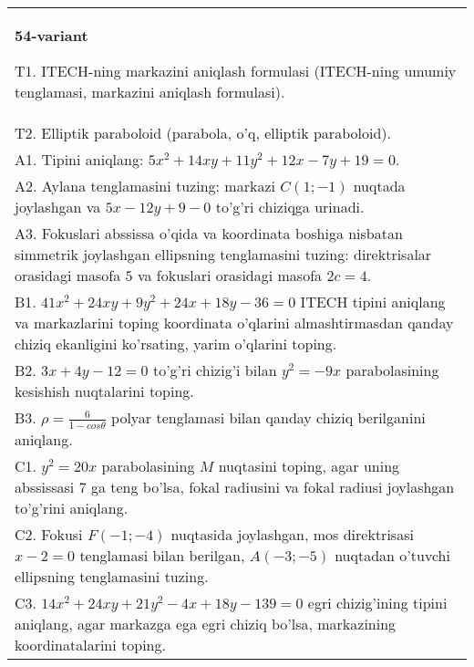 \documentclass{article}
\begin{document}
\begin{tabular}{m{17cm}}
\textbf{54-variant}
\newline

T1. ITECH-ning markazini aniqlash formulasi (ITECH-ning umumiy tenglamasi, markazini aniqlash formulasi).\\

T2. Elliptik paraboloid (parabola, o'q, elliptik paraboloid).\\

A1. Tipini aniqlang: $5x^{2}+14xy+11y^{2}+12x-7y+19=0$.\\

A2. Aylana tenglamasini tuzing: markazi $C(1;-1)$ nuqtada joylashgan va $5x-12y+9-0$ to'g'ri chiziqga urinadi.\\

A3. Fokuslari abssissa o'qida va koordinata boshiga nisbatan simmetrik joylashgan ellipsning tenglamasini tuzing: direktrisalar orasidagi masofa $5$ va fokuslari orasidagi masofa $2c=4$.\\

B1. $41x^{2} + 24xy + 9y^{2} + 24x + 18y - 36 = 0$ ITECH tipini aniqlang va markazlarini toping koordinata o'qlarini almashtirmasdan qanday chiziq ekanligini ko'rsating, yarim o'qlarini toping.  \\

B2. $3x + 4y - 12 = 0$ to'g'ri chizig'i bilan $y^{2} = - 9x$ parabolasining kesishish nuqtalarini toping.  \\

B3. $\rho = \frac{6}{1 - cos\theta}$ polyar tenglamasi bilan qanday chiziq berilganini aniqlang.  \\

C1. $y^{2} = 20x$ parabolasining $M$ nuqtasini toping, agar uning abssissasi 7 ga teng bo'lsa, fokal radiusini va fokal radiusi joylashgan to'g'rini aniqlang.\\

C2. Fokusi $F( - 1; - 4)$ nuqtasida joylashgan, mos direktrisasi $x - 2 = 0$ tenglamasi bilan berilgan, $A( - 3; - 5)$ nuqtadan o'tuvchi ellipsning tenglamasini tuzing.  \\

C3. $14x^{2} + 24xy + 21y^{2} - 4x + 18y - 139 = 0$ egri chizig'ining tipini aniqlang, agar markazga ega egri chiziq bo'lsa, markazining koordinatalarini toping.  \\

\end{tabular}
\vspace{1cm}
\end{document}
